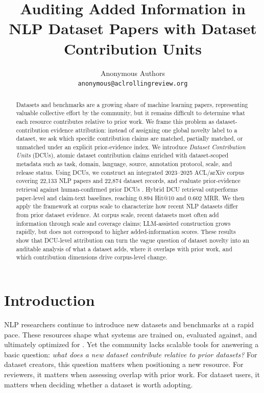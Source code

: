 \documentclass[11pt]{article}
\title{Auditing Added Information in NLP Dataset Papers with Dataset Contribution Units}
\author{Anonymous Authors \\
  \texttt{anonymous@aclrollingreview.org}}
\begin{document}
\maketitle
\begin{abstract}
Datasets and benchmarks are a growing share of machine learning papers, representing valuable collective effort by the community, but it remains difficult to determine what each resource contributes relative to prior work.
We frame this problem as dataset-contribution evidence attribution: instead of assigning one global novelty label to a dataset, we ask which specific contribution claims are matched, partially matched, or unmatched under an explicit prior-evidence index.
We introduce \emph{Dataset Contribution Units} (DCUs), atomic dataset contribution claims enriched with dataset-scoped metadata such as task, domain, language, source, annotation protocol, scale, and release status.
Using DCUs, we construct an integrated 2023--2025 ACL/arXiv corpus covering 22,133 NLP papers and 22,874 dataset records, and evaluate prior-evidence retrieval against human-confirmed prior DCUs .
Hybrid DCU retrieval outperforms paper-level and claim-text baselines, reaching 0.894 Hit@10 and 0.602 MRR.
We then apply the framework at corpus scale to characterize how recent NLP datasets differ from prior dataset evidence.
At corpus scale, recent datasets most often add information through scale and coverage claims; LLM-assisted construction grows rapidly, but does not correspond to higher added-information scores.
These results show that DCU-level attribution can turn the vague question of dataset novelty into an auditable analysis of what a dataset adds, where it overlaps with prior work, and which contribution dimensions drive corpus-level change.
\end{abstract}
\section{Introduction}
NLP researchers continue to introduce new datasets and benchmarks at a rapid pace.
These resources shape what systems are trained on, evaluated against, and ultimately optimized for \citep{gebru2021datasheets,bender2018data,raji2021benchmark}.
Yet the community lacks scalable tools for answering a basic question: \emph{what does a new dataset contribute relative to prior datasets?}
For dataset creators, this question matters when positioning a new resource.
For reviewers, it matters when assessing overlap with prior work.
For dataset users, it matters when deciding whether a dataset is worth adopting.
\end{document}
